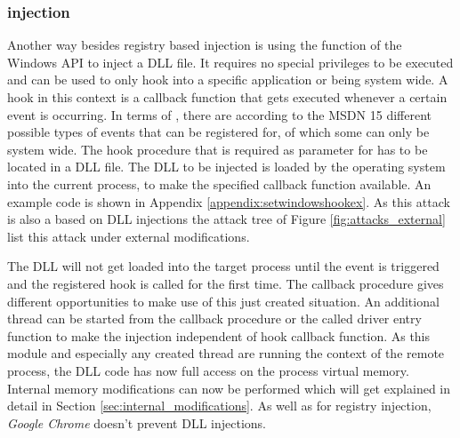 \subsubsection{ injection}
Another way besides registry based injection is using the  function of the Windows \gls{API} to inject a \gls{DLL} file. It requires no special privileges to be executed and can be used to only hook into a specific application or being system wide. A hook in this context is a callback function that gets executed whenever a certain event is occurring. In terms of , there are according to the \gls{MSDN} \cite{msdn_setwindowshookex} 15 different possible types of events that can be registered for, of which some can only be system wide. The hook procedure that is required as parameter for  has to be located in a \gls{DLL} file. The \gls{DLL} to be injected is loaded by the operating system into the current process, to make the specified callback function available. An example code is shown in Appendix \ref{appendix:setwindowshookex}. As this attack is also a based on \gls{DLL} injections the attack tree of Figure \ref{fig:attacks_external} list this attack under external modifications. 

The \gls{DLL} will not get loaded into the target process until the event is triggered and the registered hook is called for the first time. The callback procedure gives different opportunities to make use of this just created situation. An additional thread can be started from the callback procedure or the called driver entry function to make the injection independent of hook callback function. As this module and especially any created thread are running the context of the remote process, the \gls{DLL} code has now full access on the process virtual memory. Internal memory modifications can now be performed which will get explained in detail in Section \ref{sec:internal_modifications}. As well as for registry injection, \emph{Google Chrome} doesn't prevent  \gls{DLL} injections.